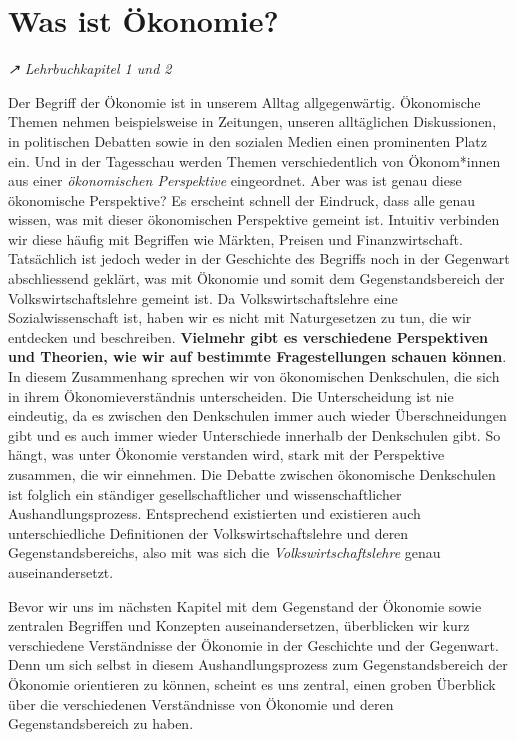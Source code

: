 \documentclass[
  nswissgerman,
  a4paper,
  DIV=11,
  numbers=noendperiod,
  oneside,
  openany]{scrreprt}
\begin{document}
\section{Was ist Ökonomie?}\label{was-ist-uxf6konomie}

\emph{↗ Lehrbuchkapitel 1 und 2}

Der Begriff der Ökonomie ist in unserem Alltag allgegenwärtig.
Ökonomische Themen nehmen beispielsweise in Zeitungen, unseren
alltäglichen Diskussionen, in politischen Debatten sowie in den sozialen
Medien einen prominenten Platz ein. Und in der Tagesschau werden Themen
verschiedentlich von Ökonom*innen aus einer \emph{ökonomischen
Perspektive} eingeordnet. Aber was ist genau diese ökonomische
Perspektive? Es erscheint schnell der Eindruck, dass alle genau wissen,
was mit dieser ökonomischen Perspektive gemeint ist. Intuitiv verbinden
wir diese häufig mit Begriffen wie Märkten, Preisen und
Finanzwirtschaft. Tatsächlich ist jedoch weder in der Geschichte des
Begriffs noch in der Gegenwart abschliessend geklärt, was mit Ökonomie
und somit dem Gegenstandsbereich der Volkswirtschaftslehre gemeint ist.
Da Volkswirtschaftslehre eine Sozialwissenschaft ist, haben wir es nicht
mit Naturgesetzen zu tun, die wir entdecken und beschreiben.
\textbf{Vielmehr gibt es verschiedene Perspektiven und Theorien, wie wir
auf bestimmte Fragestellungen schauen können}. In diesem Zusammenhang
sprechen wir von ökonomischen Denkschulen, die sich in ihrem
Ökonomieverständnis unterscheiden. Die Unterscheidung ist nie eindeutig,
da es zwischen den Denkschulen immer auch wieder Überschneidungen gibt
und es auch immer wieder Unterschiede innerhalb der Denkschulen gibt. So
hängt, was unter Ökonomie verstanden wird, stark mit der Perspektive
zusammen, die wir einnehmen. Die Debatte zwischen ökonomische
Denkschulen ist folglich ein ständiger gesellschaftlicher und
wissenschaftlicher Aushandlungsprozess. Entsprechend existierten und
existieren auch unterschiedliche Definitionen der Volkswirtschaftslehre
und deren Gegenstandsbereichs, also mit was sich die
\emph{Volkswirtschaftslehre} genau auseinandersetzt.

Bevor wir uns im nächsten Kapitel mit dem Gegenstand der Ökonomie sowie
zentralen Begriffen und Konzepten auseinandersetzen, überblicken wir
kurz verschiedene Verständnisse der Ökonomie in der Geschichte und der
Gegenwart. Denn um sich selbst in diesem Aushandlungsprozess zum
Gegenstandsbereich der Ökonomie orientieren zu können, scheint es uns
zentral, einen groben Überblick über die verschiedenen Verständnisse von
Ökonomie und deren Gegenstandsbereich zu haben.
\end{document}
